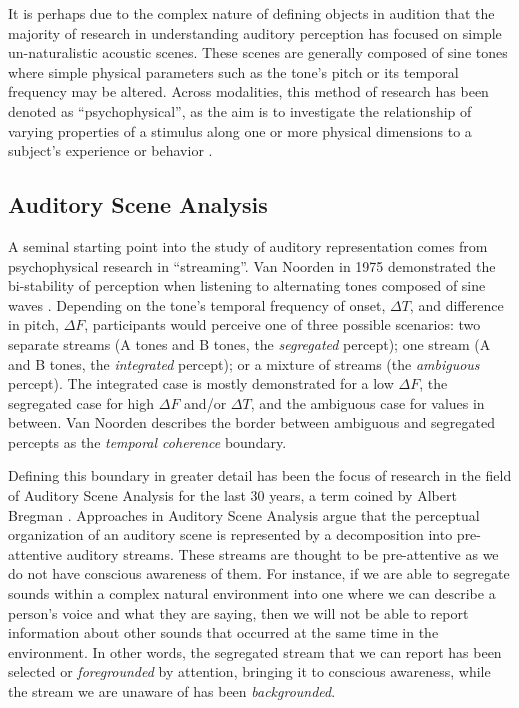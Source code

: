 It is perhaps due to the complex nature of defining objects in audition that the majority of research in understanding auditory perception has focused on simple un-naturalistic acoustic scenes.  These scenes are generally composed of sine tones where simple physical parameters such as the tone's pitch or its temporal frequency may be altered.  Across modalities, this method of research has been denoted as ``psychophysical'', as the aim is to investigate the relationship of varying properties of a stimulus along one or more physical dimensions to a subject's experience or behavior \cite{}.  

\subsection{Auditory Scene Analysis}

A seminal starting point into the study of auditory representation comes from psychophysical research in ``streaming''.  Van Noorden in 1975 demonstrated the bi-stability of perception when listening to alternating tones composed of sine waves \cite{Noorden1975}.  Depending on the tone's temporal frequency of onset, $\Delta T$, and difference in pitch, $\Delta F$, participants would perceive one of three possible scenarios: two separate streams (A tones and B tones, the \textit{segregated} percept); one stream (A and B tones, the \textit{integrated} percept); or a mixture of streams (the \textit{ambiguous} percept).  The integrated case is mostly demonstrated for a low $\Delta F$, the segregated case for high $\Delta F$ and/or $\Delta T$, and the ambiguous case for values in between.  Van Noorden describes the border between ambiguous and segregated percepts as the \textit{temporal coherence} boundary.  

Defining this boundary in greater detail has been the focus of research in the field of Auditory Scene Analysis for the last 30 years, a term coined by Albert Bregman \cite{Bregman1990}.  Approaches in Auditory Scene Analysis argue that the perceptual organization of an auditory scene is represented by a decomposition into pre-attentive auditory streams.  These streams are thought to be pre-attentive as we do not have conscious awareness of them.  For instance, if we are able to segregate sounds within a complex natural environment into one where we can describe a person's voice and what they are saying, then we will not be able to report information about other sounds that occurred at the same time in the environment.  In other words, the segregated stream that we can report has been selected or \textit{foregrounded} by attention, bringing it to conscious awareness, while the stream we are unaware of has been \textit{backgrounded}.  

